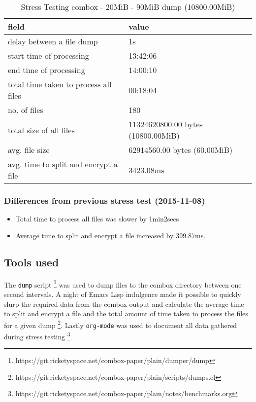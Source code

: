 \begin{center}
  \begin{table}[h]
    \begin{tabular}{ll}
      field & value\\
      \hline
      delay between a file dump & 1s\\
      start time of processing & 13:42:06\\
      end time of processing & 14:00:10\\
      total time taken to process all files & 00:18:04\\
      no. of files & 180\\
      total size of all files & 11324620800.00 bytes (10800.00MiB)\\
      avg. file size & 62914560.00 bytes (60.00MiB)\\
      avg. time to split and encrypt a file & 3423.08ms\\
    \end{tabular}
    \caption{Stress Testing combox - 20MiB - 90MiB dump (10800.00MiB)}
  \end{table}
\end{center}

\subsubsection{Differences from previous stress test (2015-11-08)}

\begin{itemize}
\item Total time to process all files was slower by 1min2secs
\item Average time to split and encrypt a file increased by 399.87ms.
\end{itemize}

\subsection{Tools used}\label{4-st-tu}

The \verb+dump+ script
\footnote{https://git.ricketyspace.net/combox-paper/plain/dumper/dump}
was used to dump files to the combox directory between one second
intervals. A night of Emacs Lisp indulgence made it possible to
quickly slurp the required data from the combox output and calculate
the average time to split and encrypt a file and the total amount of
time taken to process the files for a given dump
\footnote{https://git.ricketyspace.net/combox-paper/plain/scripts/dumps.el}.
Lastly \verb+org-mode+ was used to document all data gathered during
stress testing
\footnote{https://git.ricketyspace.net/combox-paper/plain/notes/benchmarks.org}.

